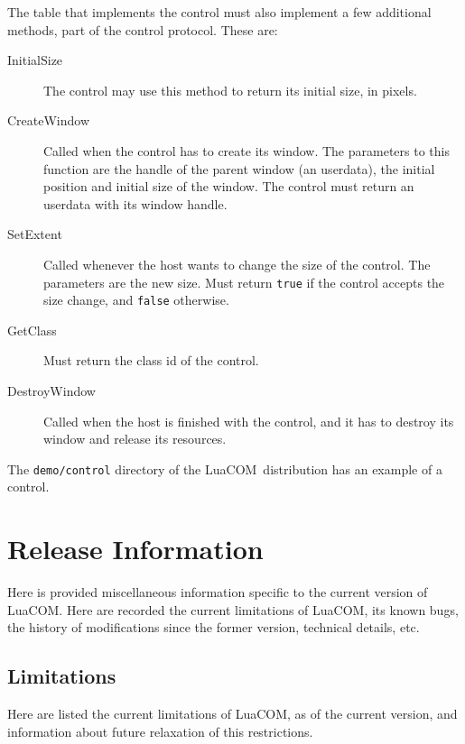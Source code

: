\documentclass[11pt,a4paper,english]{report}
\newcommand{\techname}[1]{\mbox{#1}}
\newcommand{\luacom}{\techname{LuaCOM}}
\begin{document}
The table that implements the control must also implement a few
additional methods, part of the control protocol. These are:

\begin{description}
\item[InitialSize] The control may use this method to return its
 initial size, in pixels.
\item[CreateWindow] Called when the control has to create its
window. The parameters to this function are the handle of the parent
window (an userdata), the initial position and initial size of the
window. The control must return an userdata with its window handle.
\item[SetExtent] Called whenever the host wants to change the size
of the control. The parameters are the new size. Must return
\verb+true+ if the control accepts the size change, and \verb+false+
otherwise.
\item[GetClass] Must return the class id of the control.
\item[DestroyWindow] Called when the host is finished with the control, and
it has to destroy its window and release its resources.
\end{description}

The \verb+demo/control+ directory of the \luacom\ distribution has
an example of a control.


\chapter{Release Information}
\label{chap:release}

Here is provided miscellaneous information specific to the current
version of \luacom. Here are recorded the current limitations of
\luacom, its known bugs, the history of modifications since the former
version, technical details, etc.

\section{Limitations}
\label{sect:limitations}

Here are listed the current limitations of \luacom, as of the current
version, and information about future relaxation of this restrictions.
\end{document}
